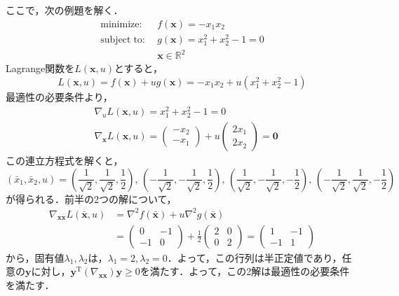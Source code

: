 \documentclass{jsreport}
\begin{document}
ここで，次の例題を解く．
\begin{align}
  \mathrm{minimize} : \; &f(\bm{x}) = -x_1 x_2 \nonumber\\
  \mathrm{subject \; to} : \; &g(\bm{x}) = x_1^2 + x_2^2 - 1 = 0 \nonumber \\
  &\bm{x} \in \mathbb{R}^2 \nonumber
\end{align}
Lagrange関数を$L(\bm{x}, u)$とすると，
\begin{equation}
  L(\bm{x}, u) = f(\bm{x}) + u g(\bm{x}) = -x_1 x_2 + u(x_1^2 + x_2^2 - 1) \nonumber
\end{equation}
最適性の必要条件より，
\begin{align}
  &\nabla_u L(\bm{x}, u) = x_1^2 + x_2^2 - 1 = 0 \nonumber \\
  &\nabla_{\bm{x}} L(\bm{x}, u) = \left(
  \begin{array}{c}
    -x_2 \\
    -x_1
  \end{array}
  \right) + u\left(
  \begin{array}{c}
    2x_1 \\
    2x_2
  \end{array}
  \right) = \bm{0} \nonumber
\end{align}
この連立方程式を解くと，
\begin{equation}
  (\bar{x}_1, \bar{x}_2, u) =
  \left(\frac{1}{\sqrt{2}}, \frac{1}{\sqrt{2}}, \frac{1}{2}\right), \,
  \left(- \frac{1}{\sqrt{2}}, - \frac{1}{\sqrt{2}}, \frac{1}{2}\right), \,
  \left(\frac{1}{\sqrt{2}}, - \frac{1}{\sqrt{2}}, - \frac{1}{2}\right), \,
  \left(- \frac{1}{\sqrt{2}}, \frac{1}{\sqrt{2}}, - \frac{1}{2}\right) \nonumber
\end{equation}
が得られる．前半の2つの解について，
\begin{align}
  \nabla_{\bm{xx}} L(\bar{\bm{x}}, u) &= {\nabla}^2 f(\bar{\bm{x}}) + u {\nabla}^2 g(\bar{\bm{x}}) \nonumber \\
  &= \left(
  \begin{array}{cc}
    0 & -1 \\
    -1 & 0
  \end{array}
  \right) + \frac{1}{2} \left(
  \begin{array}{cc}
    2 & 0 \\
    0 & 2
  \end{array}
  \right) = \left(
  \begin{array}{cc}
    1 & -1 \\
    -1 & 1
  \end{array}
  \right) \nonumber
\end{align}
から，固有値$\lambda_1, \lambda_2$は，$\lambda_1 = 2, \lambda_2 = 0$．よって，この行列は半正定値であり，任意の$\bm{y}$に対し，$\bm{y}^{\mathrm{T}} (\nabla_{\bm{xx}}) \bm{y} \geq 0$を満たす．よって，この2解は最適性の必要条件を満たす．
\end{document}
